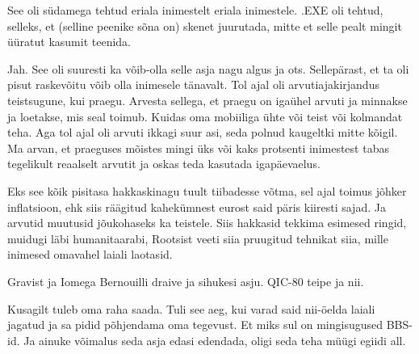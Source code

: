 
See oli südamega tehtud eriala inimestelt eriala inimestele. .EXE oli tehtud, 
selleks, et (selline peenike sõna on) skenet juurutada, mitte et selle pealt 
mingit üüratut kasumit teenida. 


Jah. See oli suuresti ka võib-olla selle asja nagu algus ja ots. Sellepärast, 
et ta oli pisut raskevõitu võib olla inimesele tänavalt. Tol ajal oli 
arvutiajakirjandus  teistsugune, kui praegu. Arvesta sellega, et praegu on 
igaühel arvuti ja minnakse ja loetakse, mis seal toimub. Kuidas oma mobiiliga 
ühte või teist või kolmandat teha. Aga tol ajal oli arvuti ikkagi suur asi, 
seda polnud kaugeltki mitte kõigil. Ma arvan, et praeguses mõistes mingi üks 
või kaks protsenti inimestest tabas tegelikult reaalselt arvutit ja oskas teda 
kasutada igapäevaelus.
                 

Eks see kõik pisitasa hakkaskinagu tuult tiibadesse võtma, sel ajal toimus 
jõhker inflatsioon, ehk siis räägitud kahekümnest eurost said päris kiiresti 
sajad. Ja arvutid muutusid jõukohaseks ka teistele. Siis hakkasid tekkima 
esimesed ringid, muidugi läbi humanitaarabi, Rootsist veeti siia pruugitud 
tehnikat siia, mille inimesed omavahel laiali laotasid.


Gravist ja Iomega Bernouilli draive ja sihukesi asju. QIC-80 
teipe ja nii.


Kusagilt tuleb oma raha saada. Tuli see aeg, kui varad said nii-öelda laiali 
jagatud ja sa pidid põhjendama oma tegevust. Et miks sul on mingisugused 
BBS-id. Ja ainuke võimalus seda asja edasi edendada, oligi seda teha müügi 
egiidi all.


